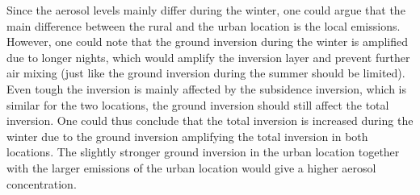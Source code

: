 Since the aerosol levels mainly differ during the winter, one could argue that the main difference between the rural and the urban location is the local emissions. However, one could note that the ground inversion during the winter is amplified due to longer nights, which would amplify the inversion layer and prevent further air mixing (just like the ground inversion during the summer should be limited). Even tough the inversion is mainly affected by the subsidence inversion, which is similar for the two locations, the ground inversion should still affect the total inversion. One could thus conclude that the total inversion is increased during the winter due to the ground inversion amplifying the total inversion in both locations. The slightly stronger ground inversion in the urban location together with the larger emissions of the urban location would give a higher aerosol concentration.
